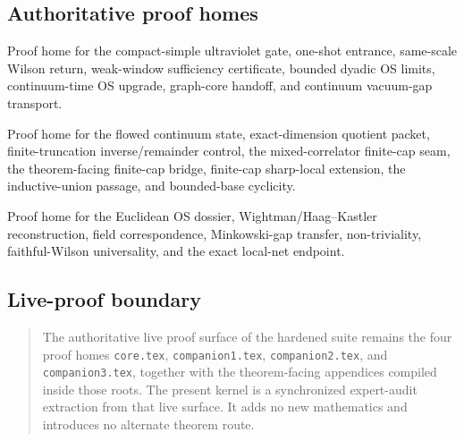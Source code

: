 \subsection*{Authoritative proof homes}
\begin{description}[leftmargin=2.2em,style=nextline]
\item[Companion~I.] Proof home for the compact-simple ultraviolet gate, one-shot entrance, same-scale Wilson return, weak-window sufficiency certificate, bounded dyadic OS limits, continuum-time OS upgrade, graph-core handoff, and continuum vacuum-gap transport.
\item[Companion~II.] Proof home for the flowed continuum state, exact-dimension quotient packet, finite-truncation inverse/remainder control, the mixed-correlator finite-cap seam, the theorem-facing finite-cap bridge, finite-cap sharp-local extension, the inductive-union passage, and bounded-base cyclicity.
\item[Companion~III.] Proof home for the Euclidean OS dossier, Wightman/Haag--Kastler reconstruction, field correspondence, Minkowski-gap transfer, non-triviality, faithful-Wilson universality, and the exact local-net endpoint.
\end{description}

\subsection*{Live-proof boundary}
\begin{quote}\small
The authoritative live proof surface of the hardened suite remains the four proof homes \texttt{core.tex}, \texttt{companion1.tex}, \texttt{companion2.tex}, and \texttt{companion3.tex}, together with the theorem-facing appendices compiled inside those roots. The present kernel is a synchronized expert-audit extraction from that live surface. It adds no new mathematics and introduces no alternate theorem route.
\end{quote}
